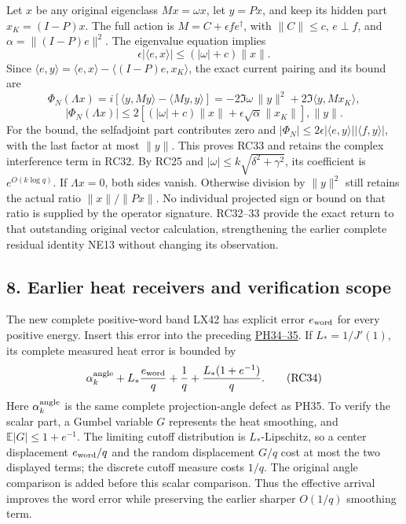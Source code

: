\documentclass[10pt]{article}
\begin{document}
Let \(x\) be any original eigenclass \(Mx=\omega x\), let \(y=Px\), and keep its hidden part \(x_K=(I-P)x\). The full action is \(M=C+\epsilon fe^\dagger\), with \(\|C\|\le c\), \(e\perp f\), and \(\alpha=\|(I-P)e\|^2\). The eigenvalue equation implies \[
\epsilon|\langle e,x\rangle|\le(|\omega|+c)\|x\|.
\] Since \(\langle e,y\rangle=\langle e,x\rangle-
\langle(I-P)e,x_K\rangle\), the exact current pairing and its bound are \[
\Phi_N(\Lambda x)=i[\langle y,My\rangle-\langle My,y\rangle]
=-2\Im\omega\,\|y\|^2+2\Im\langle y,Mx_K\rangle,
\tag{RC32}
\] \[
\boxed{|\Phi_N(\Lambda x)|\le
2[(|\omega|+c)\|x\|+\epsilon\sqrt\alpha\|x_K\|],\|y\|.}
\tag{RC33}
\] For the bound, the selfadjoint part contributes zero and \(|\Phi_N|\le2\epsilon|\langle e,y\rangle||\langle f,y\rangle|\), with the last factor at most \(\|y\|\). This proves RC33 and retains the complex interference term in RC32. By RC25 and \(|\omega|\le k\sqrt{\delta^2+\gamma^2}\), its coefficient is \(e^{O(k\log q)}\). If \(\Lambda x=0\), both sides vanish. Otherwise division by \(\|y\|^2\) still retains the actual ratio \(\|x\|/\|Px\|\). No individual projected sign or bound on that ratio is supplied by the operator signature. RC32--33 provide the exact return to that outstanding original vector calculation, strengthening the earlier complete residual identity NE13 without changing its observation.

\subsection{8. Earlier heat receivers and verification scope}\label{earlier-heat-receivers-and-verification-scope}

The new complete positive-word band LX42 has explicit error \(e_{\rm word}\) for every positive energy. Insert this error into the preceding \href{https://github.com/KokunoYumeto/zeta-function-research-reader/blob/6cf5b3aa8ff395eba6b5512b28d117334da5767b/workbenches/splitzero-tandem/continuations/20260922-cutoff-profile/PHASE_HEAT_PROOFS.md\#L641}{PH34--35}. If \(L_*=1/J'(1)\), its complete measured heat error is bounded by \[
\alpha_k^{\rm angle}+L_*\frac{e_{\rm word}}q+
\frac1q+\frac{L_*(1+e^{-1})}q.
\tag{RC34}
\] Here \(\alpha_k^{\rm angle}\) is the same complete projection-angle defect as PH35. To verify the scalar part, a Gumbel variable \(G\) represents the heat smoothing, and \(\mathbb E|G|\le1+e^{-1}\). The limiting cutoff distribution is \(L_*\)-Lipschitz, so a center displacement \(e_{\rm word}/q\) and the random displacement \(G/q\) cost at most the two displayed terms; the discrete cutoff measure costs \(1/q\). The original angle comparison is added before this scalar comparison. Thus the effective arrival improves the word error while preserving the earlier sharper \(O(1/q)\) smoothing term.
\end{document}
